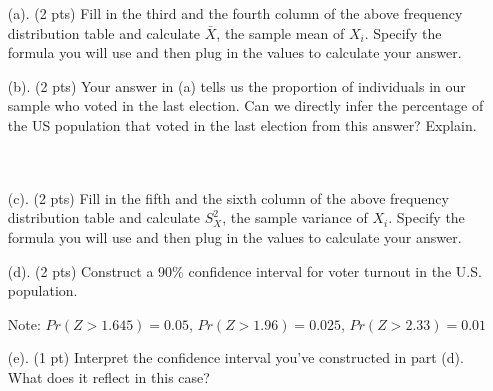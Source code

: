 \documentclass{./../../Latex/tests}
\begin{document}
 \begin{enumerate}
 \item[(a).] (2 pts) Fill in the third and the fourth column of the above frequency distribution table and calculate $\bar{X}$,  the sample mean of $X_i$. Specify the formula you will use and then plug in the values to calculate your answer. 
\newpage
\item[(b).] (2 pts) Your answer in (a) tells us the proportion of individuals in our sample who voted in the last election. Can we directly infer the percentage of the US population that voted in the last election from this answer? Explain. \\~\\
\vspace{6cm} \\
\item[(c).] (2 pts) Fill in the fifth and the sixth column of the above frequency distribution table and calculate $S^2_X$,  the sample variance of $X_i$. Specify the formula you will use and then plug in the values to calculate your answer. 
\newpage
\item[(d).] (2 pts) Construct a 90\% confidence interval for voter turnout in the U.S. population.

Note: $Pr(Z>1.645) = 0.05$, $Pr(Z>1.96) = 0.025$, $Pr(Z>2.33) = 0.01$
 
\vspace{6cm}

\item[(e).] (1 pt) Interpret the confidence interval you’ve constructed in part (d). What does it reflect in this case? 
\end{enumerate}
\end{document}
